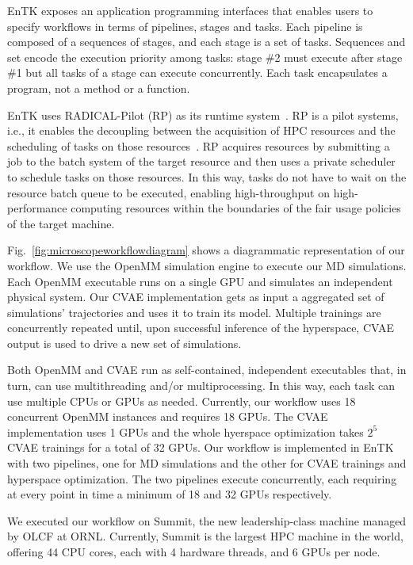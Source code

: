 \documentclass[conference,final]{IEEEtran}
\begin{document}
EnTK exposes an application programming interfaces that enables users to
specify workflows in terms of pipelines, stages and tasks. Each pipeline is
composed of a sequences of stages, and each stage is a set of tasks.
Sequences and set encode the execution priority among tasks: stage \#2 must
execute after stage \#1 but all tasks of a stage can execute concurrently.
Each task encapsulates a program, not a method or a function.

EnTK uses RADICAL-Pilot (RP) as its runtime system~\cite{merzky2018using}. RP
is a pilot systems, i.e., it enables the decoupling between the acquisition
of HPC resources and the scheduling of tasks on those
resources~\cite{turilli2018comprehensive}. RP acquires resources by
submitting a job to the batch system of the target resource and then uses a
private scheduler to schedule tasks on those resources. In this way, tasks do
not have to wait on the resource batch queue to be executed, enabling
high-throughput on high-performance computing resources within the boundaries
of the fair usage policies of the target machine.

Fig.~\ref{fig:microscopeworkflowdiagram} shows a diagrammatic representation
of our workflow. We use the OpenMM simulation engine to execute our MD
simulations. Each OpenMM executable runs on a single GPU and simulates an
independent physical system. Our CVAE implementation gets as input a
aggregated set of simulations' trajectories and uses it to train its model.
Multiple trainings are concurrently repeated until, upon successful inference
of the hyperspace, CVAE output is used to drive a new set of simulations.

Both OpenMM and CVAE run as self-contained, independent executables that, in
turn, can use multithreading and/or multiprocessing. In this way, each task
can use multiple CPUs or GPUs as needed. Currently, our workflow uses 18
concurrent OpenMM instances and requires 18 GPUs. The CVAE implementation
uses 1 GPUs and the whole hyerspace optimization takes $2^5$ CVAE trainings
for a total of 32 GPUs. Our workflow is implemented in EnTK with two
pipelines, one for MD simulations and the other for CVAE trainings and
hyperspace optimization. The two pipelines execute concurrently, each
requiring at every point in time a minimum of 18 and 32 GPUs respectively.

We executed our workflow on Summit, the new leadership-class machine managed
by OLCF at ORNL\@. Currently, Summit is the largest HPC machine in the world,
offering 44 CPU cores, each with 4 hardware threads, and 6 GPUs per node.
\end{document}
